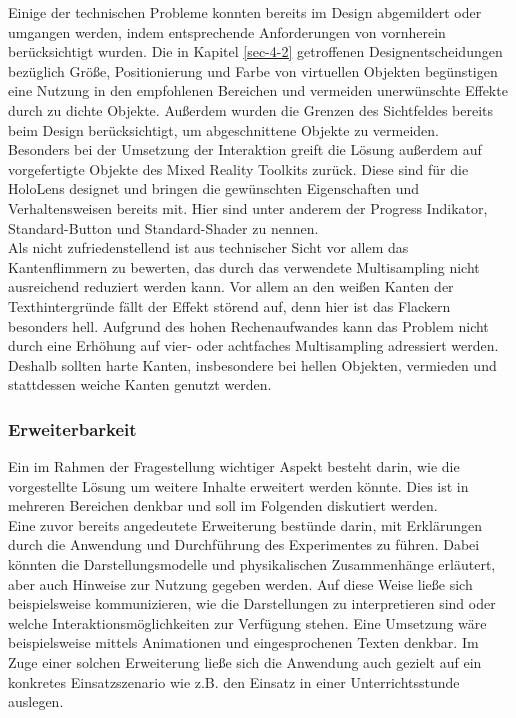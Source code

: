 Einige der technischen Probleme konnten bereits im Design abgemildert oder umgangen werden, indem entsprechende Anforderungen von vornherein berücksichtigt wurden. Die in Kapitel \ref{sec-4-2} getroffenen Designentscheidungen bezüglich Größe, Positionierung und Farbe von virtuellen Objekten begünstigen eine Nutzung in den empfohlenen Bereichen und vermeiden unerwünschte Effekte durch zu dichte Objekte. Außerdem wurden die Grenzen des Sichtfeldes bereits beim Design berücksichtigt, um abgeschnittene Objekte zu vermeiden.\\
\noindent\hspace*{5mm}
Besonders bei der Umsetzung der Interaktion greift die Lösung außerdem auf vorgefertigte Objekte des Mixed Reality Toolkits zurück. Diese sind für die HoloLens designet und bringen die gewünschten Eigenschaften und Verhaltensweisen bereits mit. Hier sind unter anderem der Progress Indikator, Standard-Button und Standard-Shader zu nennen.\\

Als nicht zufriedenstellend ist aus technischer Sicht vor allem das Kantenflimmern zu bewerten, das durch das verwendete Multisampling nicht ausreichend reduziert werden kann. Vor allem an den weißen Kanten der Texthintergründe fällt der Effekt störend auf, denn hier ist das Flackern besonders hell. Aufgrund des hohen Rechenaufwandes kann das Problem nicht durch eine Erhöhung auf vier- oder achtfaches Multisampling adressiert werden. Deshalb sollten harte Kanten, insbesondere bei hellen Objekten, vermieden und stattdessen weiche Kanten genutzt werden.\\


\subsubsection{Erweiterbarkeit}
Ein im Rahmen der Fragestellung wichtiger Aspekt besteht darin, wie die vorgestellte Lösung um weitere Inhalte erweitert werden könnte. Dies ist in mehreren Bereichen denkbar und soll im Folgenden diskutiert werden.\\

Eine zuvor bereits angedeutete Erweiterung bestünde darin, mit Erklärungen durch die Anwendung und Durchführung des Experimentes zu führen. Dabei könnten die Darstellungsmodelle und physikalischen Zusammenhänge erläutert, aber auch Hinweise zur Nutzung gegeben werden. Auf diese Weise ließe sich beispielsweise kommunizieren, wie die Darstellungen zu interpretieren sind oder welche Interaktionsmöglichkeiten zur Verfügung stehen. Eine Umsetzung wäre beispielsweise mittels Animationen und eingesprochenen Texten denkbar. Im Zuge einer solchen Erweiterung ließe sich die Anwendung auch gezielt auf ein konkretes Einsatzszenario wie z.B. den Einsatz in einer Unterrichtsstunde auslegen.\\

